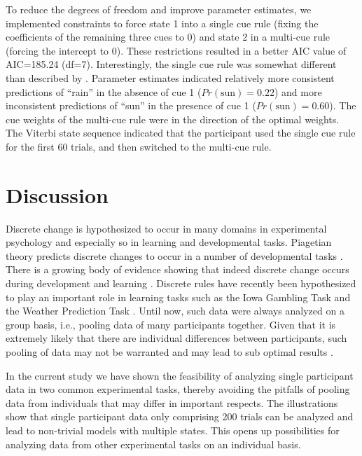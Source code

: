 \documentclass[a4paper,12pt,man]{apa} %
\newcommand{\citep}{\cite}
\newcommand{\citet}{\citeA}
\begin{document}
To reduce the degrees of freedom and improve parameter estimates, we
implemented constraints to force state 1 into a single cue rule
(fixing the coefficients of the remaining three cues to 0) and state 2
in a multi-cue rule (forcing the intercept to 0).  These
restrictions resulted in a better AIC value of AIC=185.24 (df=7).
Interestingly, the single cue rule was somewhat different than
described by \citet{Gluck2002}.  Parameter estimates indicated relatively
more consistent predictions of ``rain'' in the absence of cue 1
($Pr(\text{sun}) = 0.22$) and more inconsistent predictions of ``sun''
in the presence of cue 1 ($Pr(\text{sun}) = 0.60$).  The cue weights
of the multi-cue rule were in the direction of the optimal
weights.  The Viterbi state sequence indicated that the participant
used the single cue rule for the first 60 trials, and then
switched to the multi-cue rule.


\section{Discussion}

Discrete change is hypothesized to occur in many domains in
experimental psychology and especially so in learning and
developmental tasks.  Piagetian theory predicts discrete changes to
occur in a number of developmental tasks \citep{Inhelder1958}.  There
is a growing body of evidence showing that indeed discrete change
occurs during development and learning
\citep{Jansen2001b,Maas1992,Raijmakers2001,Schmittmann2006}.  Discrete
rules have recently been hypothesized to play an important role in
learning tasks such as the Iowa Gambling Task \citep{Huizenga2007b}
and the Weather Prediction Task \citep{Gluck2002}.  Until now, such
data were always analyzed on a group basis, i.e., pooling data of many
participants together.  Given that it is extremely likely that there
are individual differences between participants, such pooling of data
may not be warranted and may lead to sub optimal results
\citep{Gallistel2004,Molenaar2005}.

In the current study we have shown the feasibility of analyzing single
participant data in two common experimental tasks, thereby avoiding
the pitfalls of pooling data from individuals that may differ in
important respects.  The illustrations show that single participant
data only comprising 200 trials can be analyzed and lead to
non-trivial models with multiple states.  This opens up possibilities
for analyzing data from other experimental tasks on an individual
basis.
\end{document}
